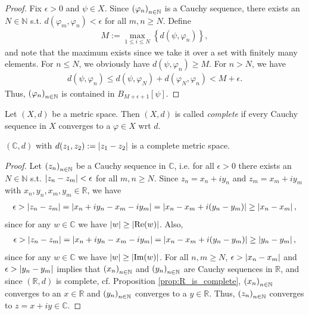 \begin{proof}
	Fix $\epsilon > 0$ and $\psi\in X$. Since $\seq[\varphi_n]$ is a Cauchy sequence, there exists an $N\in\mathbb N$ s.t. $d(\varphi_m, \varphi_n) <\epsilon$ for all $m, n\geq N$. Define
	\begin{align}
		M := \max_{1\leq i\leq N}\left\{ d(\psi, \varphi_n) \right\}, 
	\end{align}
	and note that the maximum exists since we take it over a set with finitely many elements. For $n\leq N$, we obviously have $d(\psi, \varphi_n)\geq M$. For $n > N$, we have
	\begin{align*}
		d(\psi, \varphi_n) \leq d(\psi, \varphi_N) + d(\varphi_N, \varphi_n) < M + \epsilon.
	\end{align*}
	Thus, $\seq[\varphi_n]$ is contained in $B_{M + \epsilon + 1}[\psi]$.
\end{proof}

\begin{defn}
	Let $(X, d)$ be a metric space. Then $(X, d)$ is called \textit{complete} if every Cauchy sequence in $X$ converges to a $\varphi\in X$ wrt $d$.
\end{defn}

\begin{exmp}\label{exmp:complex_numbers_complete}
	$(\mathbb C, d)$ with $d(z_1, z_2) := \abs{z_1 - z_2}$ is a complete metric space. 
\end{exmp}

\begin{proof}
	Let $\seq[z_n]$ be a Cauchy sequence in $\mathbb C$, i.e. for all $\epsilon > 0$ there exists an $N\in\mathbb N$ s.t. $\abs{z_n - z_m} < \epsilon$ for all $m, n\geq N$. Since $z_n = x_n + iy_n$ and $z_m = x_m + iy_m$ with $x_n, y_n, x_m, y_m\in\mathbb R$, we have 
	\begin{align*}
		\epsilon > \abs{z_n - z_m} = \abs{x_n + iy_n - x_m - iy_m} = \abs{x_n - x_m + i(y_n - y_m)} \geq \abs{x_n - x_m},
	\end{align*}
	since for any $w\in\mathbb C$ we have $\abs{w} \geq \abs{\text{Re}(w)}$. Also, 
	\begin{align*}
		\epsilon > \abs{z_n - z_m} = \abs{x_n + iy_n - x_m - iy_m} = \abs{x_n - x_m + i(y_n - y_m)} \geq \abs{y_n - y_m},
	\end{align*}
	since for any $w\in\mathbb C$ we have $\abs{w} \geq \abs{\text{Im}(w)}$. For all $n, m\geq N$, $\epsilon > \abs{x_n - x_m}$ and $\epsilon > \abs{y_n - y_m}$ implies that $\seq[x_n]$ and $\seq[y_n]$ are Cauchy sequences in $\mathbb R$, and since $(\mathbb R, d)$ is complete, cf. Proposition \ref{prop:R_is_complete}, $\seq[x_n]$ converges to an $x\in\mathbb R$ and $\seq[y_n]$ converges to a $y\in\mathbb R$. Thus, $\seq[z_n]$ converges to $z = x + iy\in\mathbb C$. 
	
\end{proof}

